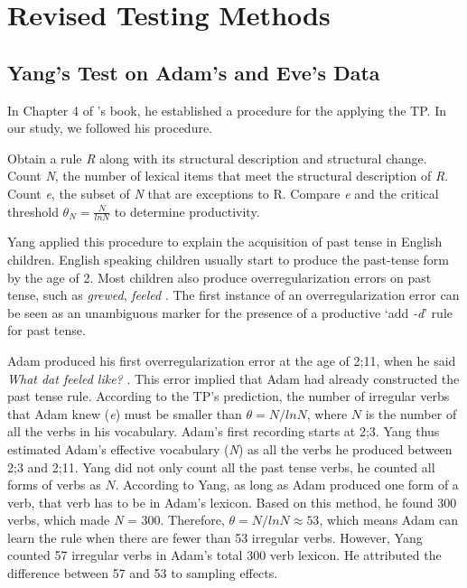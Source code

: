 \section{Revised Testing Methods}
\subsection{Yang's Test on Adam's and Eve's Data}
In Chapter 4 of \cite{yang2016price}'s book, he established a procedure for the applying the TP. In our study, we followed his procedure. 
\begin{exe}
\ex 
\begin{xlist}
\ex Obtain a rule \textit{R} along with its structural description and structural change. 
\ex Count \textit{N}, the number of lexical items that meet the structural description of \textit{R}.
\ex Count \textit{e}, the subset of \textit{N} that are exceptions to R.
\ex Compare \textit{e} and the critical threshold $\theta_N = \frac{N}{lnN}$ to determine productivity.
\end{xlist}
\end{exe}

Yang applied this procedure to explain the acquisition of past tense in English children. English speaking children usually start to produce the past-tense form by the age of 2. Most children also produce overregularization errors on past tense, such as \textit{grewed}, \textit{feeled} \citep[e.g.][]{marcus1992overregularization}. The first instance of an overregularization error can be seen as an unambiguous marker for the presence of a productive `add \textit{-d}' rule for past tense. 

Adam produced his first overregularization error at the age of 2;11, when he said \textit{What dat feeled like?} \citep{brown19731}. This error implied that Adam had already constructed the past tense rule.  
According to the TP's prediction, the number of irregular verbs that Adam knew (\textit{e}) must be smaller than $\theta = N/lnN$, where $N$ is the number of all the verbs in his vocabulary. Adam's first recording starts at 2;3. Yang thus estimated Adam's effective vocabulary (\textit{N}) as all the verbs he produced between 2;3 and 2;11. Yang did not only count all the past tense verbs, he counted all forms of verbs as $N$. According to Yang, as long as Adam produced one form of a verb, that verb has to be in Adam's lexicon. Based on this method, he found 300 verbs, which made \textit{N} = 300. Therefore, $\theta = N/lnN \approx 53$, which means Adam can learn the rule when there are fewer than 53 irregular verbs. However, Yang counted 57 irregular verbs in Adam's total 300 verb lexicon. He attributed the difference between 57 and 53 to sampling effects. 

